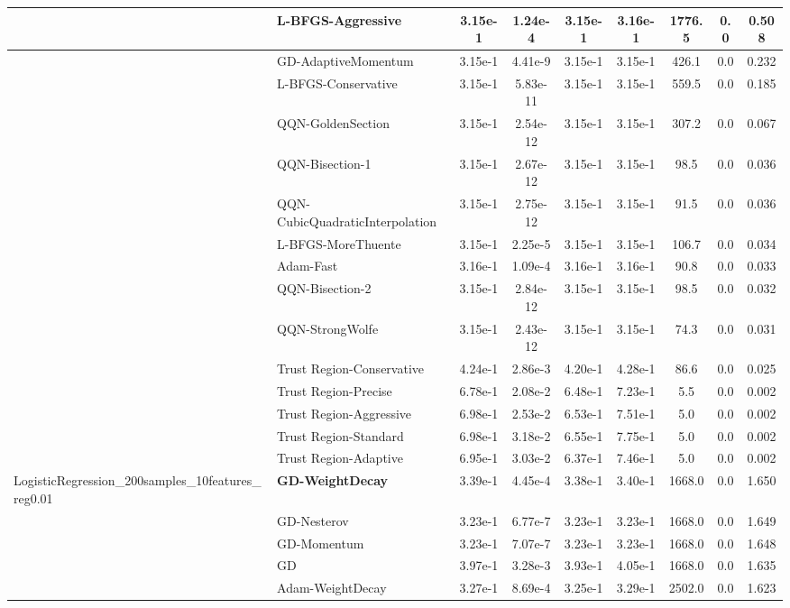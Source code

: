 \documentclass{article}
\begin{document}
\begin{longtable}{|l|l|c|c|c|c|c|c|c|}
\hline
 & L-BFGS-Aggressive & 3.15e-1 & 1.24e-4 & 3.15e-1 & 3.16e-1 & 1776.5 & 0.0 & 0.508 \\
\hline
 & GD-AdaptiveMomentum & 3.15e-1 & 4.41e-9 & 3.15e-1 & 3.15e-1 & 426.1 & 0.0 & 0.232 \\
\hline
 & L-BFGS-Conservative & 3.15e-1 & 5.83e-11 & 3.15e-1 & 3.15e-1 & 559.5 & 0.0 & 0.185 \\
\hline
 & QQN-GoldenSection & 3.15e-1 & 2.54e-12 & 3.15e-1 & 3.15e-1 & 307.2 & 0.0 & 0.067 \\
\hline
 & QQN-Bisection-1 & 3.15e-1 & 2.67e-12 & 3.15e-1 & 3.15e-1 & 98.5 & 0.0 & 0.036 \\
\hline
 & QQN-CubicQuadraticInterpolation & 3.15e-1 & 2.75e-12 & 3.15e-1 & 3.15e-1 & 91.5 & 0.0 & 0.036 \\
\hline
 & L-BFGS-MoreThuente & 3.15e-1 & 2.25e-5 & 3.15e-1 & 3.15e-1 & 106.7 & 0.0 & 0.034 \\
\hline
 & Adam-Fast & 3.16e-1 & 1.09e-4 & 3.16e-1 & 3.16e-1 & 90.8 & 0.0 & 0.033 \\
\hline
 & QQN-Bisection-2 & 3.15e-1 & 2.84e-12 & 3.15e-1 & 3.15e-1 & 98.5 & 0.0 & 0.032 \\
\hline
 & QQN-StrongWolfe & 3.15e-1 & 2.43e-12 & 3.15e-1 & 3.15e-1 & 74.3 & 0.0 & 0.031 \\
\hline
 & Trust Region-Conservative & 4.24e-1 & 2.86e-3 & 4.20e-1 & 4.28e-1 & 86.6 & 0.0 & 0.025 \\
\hline
 & Trust Region-Precise & 6.78e-1 & 2.08e-2 & 6.48e-1 & 7.23e-1 & 5.5 & 0.0 & 0.002 \\
\hline
 & Trust Region-Aggressive & 6.98e-1 & 2.53e-2 & 6.53e-1 & 7.51e-1 & 5.0 & 0.0 & 0.002 \\
\hline
 & Trust Region-Standard & 6.98e-1 & 3.18e-2 & 6.55e-1 & 7.75e-1 & 5.0 & 0.0 & 0.002 \\
\hline
 & Trust Region-Adaptive & 6.95e-1 & 3.03e-2 & 6.37e-1 & 7.46e-1 & 5.0 & 0.0 & 0.002 \\
LogisticRegression\_200samples\_10features\_reg0.01 & \textbf{GD-WeightDecay} & 3.39e-1 & 4.45e-4 & 3.38e-1 & 3.40e-1 & 1668.0 & 0.0 & 1.650 \\
\hline
 & GD-Nesterov & 3.23e-1 & 6.77e-7 & 3.23e-1 & 3.23e-1 & 1668.0 & 0.0 & 1.649 \\
\hline
 & GD-Momentum & 3.23e-1 & 7.07e-7 & 3.23e-1 & 3.23e-1 & 1668.0 & 0.0 & 1.648 \\
\hline
 & GD & 3.97e-1 & 3.28e-3 & 3.93e-1 & 4.05e-1 & 1668.0 & 0.0 & 1.635 \\
\hline
 & Adam-WeightDecay & 3.27e-1 & 8.69e-4 & 3.25e-1 & 3.29e-1 & 2502.0 & 0.0 & 1.623 \\

\end{longtable}
\end{document}
